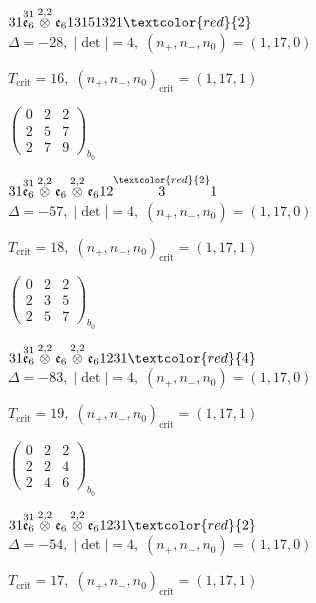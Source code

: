 \documentclass[10pt]{article}
\begin{document}
$31\overset{31}{\mathfrak{e}_6}\overset{2,2}{\otimes}\mathfrak{e}_613151321\textcolor{red}{2}$ \quad $\Delta=-28,\; |\det|=4,\; (n_+,n_-,n_0)=(1,17,0)$

\hspace{1em}$T_{\text{crit}}=16,\; (n_+,n_-,n_0)_{\text{crit}}=(1,17,1)$

\hspace{2em}$\left(\begin{smallmatrix}0 & 2 & 2 \\ 2 & 5 & 7 \\ 2 & 7 & 9\end{smallmatrix}\right)_{\!b_0}$

\smallskip

$31\overset{31}{\mathfrak{e}_6}\overset{2,2}{\otimes}\mathfrak{e}_6\overset{2,2}{\otimes}\mathfrak{e}_612\overset{\textcolor{red}{2}}{3}1$ \quad $\Delta=-57,\; |\det|=4,\; (n_+,n_-,n_0)=(1,17,0)$

\hspace{1em}$T_{\text{crit}}=18,\; (n_+,n_-,n_0)_{\text{crit}}=(1,17,1)$

\hspace{2em}$\left(\begin{smallmatrix}0 & 2 & 2 \\ 2 & 3 & 5 \\ 2 & 5 & 7\end{smallmatrix}\right)_{\!b_0}$

$31\overset{31}{\mathfrak{e}_6}\overset{2,2}{\otimes}\mathfrak{e}_6\overset{2,2}{\otimes}\mathfrak{e}_61231\textcolor{red}{4}$ \quad $\Delta=-83,\; |\det|=4,\; (n_+,n_-,n_0)=(1,17,0)$

\hspace{1em}$T_{\text{crit}}=19,\; (n_+,n_-,n_0)_{\text{crit}}=(1,17,1)$

\hspace{2em}$\left(\begin{smallmatrix}0 & 2 & 2 \\ 2 & 2 & 4 \\ 2 & 4 & 6\end{smallmatrix}\right)_{\!b_0}$

$31\overset{31}{\mathfrak{e}_6}\overset{2,2}{\otimes}\mathfrak{e}_6\overset{2,2}{\otimes}\mathfrak{e}_61231\textcolor{red}{2}$ \quad $\Delta=-54,\; |\det|=4,\; (n_+,n_-,n_0)=(1,17,0)$

\hspace{1em}$T_{\text{crit}}=17,\; (n_+,n_-,n_0)_{\text{crit}}=(1,17,1)$
\end{document}
